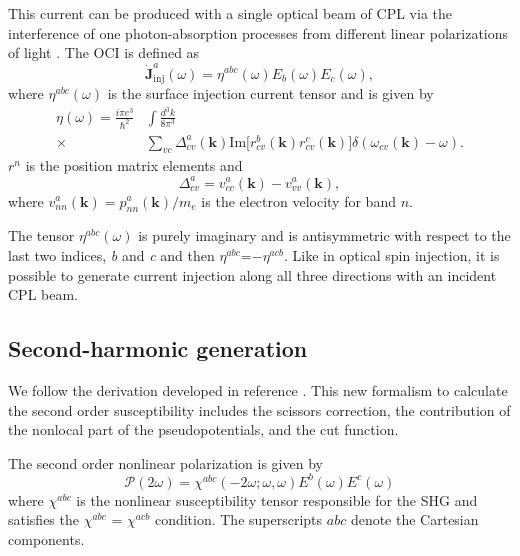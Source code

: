 \documentclass[pss]{wiley2sp} %
\begin{document}
This current can be produced with a single optical beam of CPL via the interference of one photon-absorption processes from different linear polarizations of light \cite{sipe2000second}. The  OCI is defined as
\begin{equation}
\mathbf{\dot{J}}^{a}_{\text{inj}}(\omega) =
\eta^{abc}(\omega)E_{b}(\omega)E_{c}(\omega), \label{eq:eta}
\end{equation}
where $\eta^{abc}(\omega)$ is the surface injection current tensor and is given by
\begin{align*}
\eta(\omega) =  \frac{i\pi e^{3}}{\hbar^{2}}&\int\frac{d^{3}k}{8\pi^{3}}
\nonumber \\
\times &
\sum_{vc}\Delta^{a}_{cv}(\mathbf{k})\text{Im}\big[r^{b}_{cv}(\mathbf{k})
r^{c}_{cv}(\mathbf{k})\big]\delta(\omega_{cv}(\mathbf{k})-\omega).
\end{align*}
$r^{n}$ is the position matrix elements and 
\begin{equation*}
\Delta^{a}_{cv} = v^{a}_{cc}(\mathbf{k})-v^{a}_{vv}(\mathbf{k}),
\end{equation*}
where $v^{a}_{nn}(\mathbf{k})=p^{a}_{nn}(\mathbf{k})/m_{e}$ is the electron velocity for band $n$.

The tensor $\eta^{abc}(\omega)$ is purely imaginary and is antisymmetric with respect to the last two indices, \emph{b} and \emph{c} \cite{sipe2000second,nastos2006optical} and then $\eta^{abc}$=$-\eta^{acb}$. Like in optical spin injection, it is possible to generate current injection along all three directions with an incident CPL beam.


\subsection{Second-harmonic generation}\label{sec:theory-SHG}

We follow the derivation developed in reference \cite{andersonPRB15}. This new formalism to calculate the second order susceptibility includes the scissors correction, the contribution of the nonlocal part of the pseudopotentials, and the cut function. 

The second order nonlinear polarization is given by 
\begin{equation*}
\mathcal{P}(2\omega) = \chi^{abc}(-2\omega;\omega,\omega)E^{b}(\omega)E^{c}(\omega)
\end{equation*}
where $\chi^{abc}$ is the nonlinear susceptibility tensor responsible for the SHG and satisfies the $\chi^{abc}$ = $\chi^{acb}$ condition. The superscripts $abc$ denote the Cartesian components.  
\end{document}
